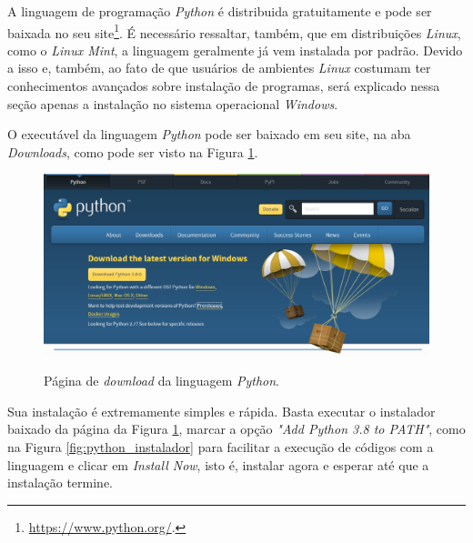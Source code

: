 \documentclass[
	12pt,				%
	openright,			%
    twoside,			%
	a4paper,			%
	chapter=TITLE,		%
	english,			%
	french,				%
	spanish,			%
	brazil				%
	]{abntex2}
\numberwithin{lema}{chapter}
\numberwithin{teorema}{chapter}
\numberwithin{definicao}{chapter}
\numberwithin{exemplo}{chapter}
\numberwithin{figure}{chapter}
\begin{document}
\begin{apendicesenv}
{	A linguagem de programação \textit{Python} é distribuida gratuitamente e pode ser baixada no seu site\footnote{\url{https://www.python.org/}.}. É necessário ressaltar, também, que em distribuições \textit{Linux}, como o \textit{Linux Mint}, a linguagem geralmente já vem instalada por padrão. Devido a isso e, também, ao fato de que usuários de ambientes \textit{Linux} costumam ter conhecimentos avançados sobre instalação de programas, será explicado nessa seção apenas a instalação no sistema operacional \textit{Windows}.
	
	O executável da linguagem \textit{Python} pode ser baixado em seu site, na aba \textit{Downloads}, como pode ser visto na Figura \ref{fig:python_pagina}.
	
	\begin{figure}[h]
		\caption{Página de \textit{download} da linguagem \textit{Python}.}
		\centering
		\includegraphics[scale=0.4]{../figuras/python/python_download.png}
		\label{fig:python_pagina}
	\end{figure}
	
	Sua instalação é extremamente simples e rápida. Basta executar o instalador baixado da página da Figura \ref{fig:python_pagina}, marcar a opção \textit{"Add Python 3.8 to PATH"}, como na Figura \ref{fig:python_instalador} para facilitar a execução de códigos com a linguagem e clicar em \textit{Install Now}, isto é, instalar agora e esperar até que a instalação termine.
	
}
\end{apendicesenv}
\end{document}
